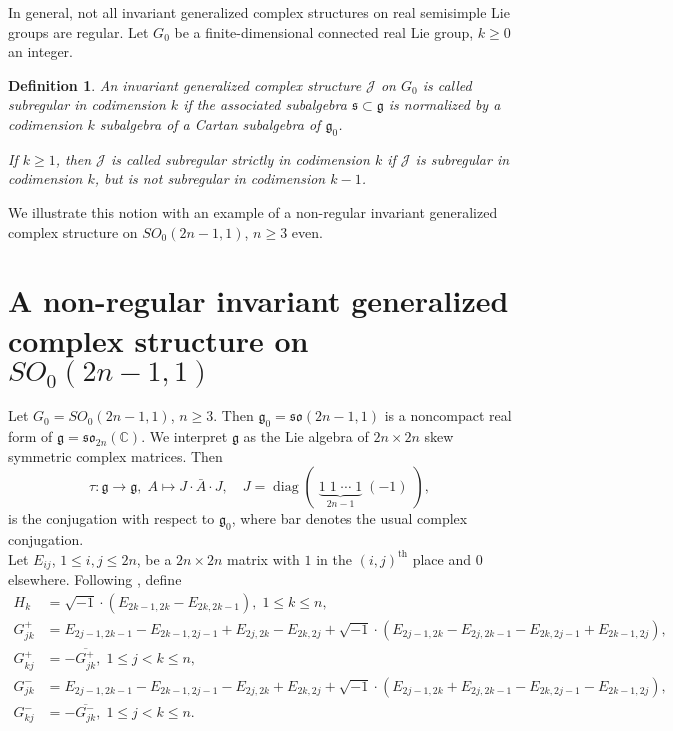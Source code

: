 \documentclass[10pt]{article}
\newtheorem{definition}[theorem]{Definition}
\begin{document}
In general, not all invariant generalized complex structures on real semisimple Lie groups are regular. Let $G_0$ be a finite-dimensional connected real Lie group, $k\geq 0$ an integer.

\begin{definition}
An invariant generalized complex structure $\mathcal J$ on $G_0$ is called \textit{subregular} \textit{in codimension $k$} if the associated subalgebra $\mathfrak{s}\subset \mathfrak{g}$ is normalized by a codimension $k$ subalgebra of a Cartan subalgebra of $\mathfrak{g}_0$.

If $k\geq 1$, then $\mathcal J$ is called \textit{subregular} \textit{strictly} \textit{in codimension $k$} if $\mathcal J$ is subregular in codimension $k$, but is not subregular in codimension $k-1$.
\end{definition}

We illustrate this notion with an example of a non-regular invariant generalized complex structure on $SO_0(2n-1,1)$, $n\geq 3$ even. 

\section{A non-regular invariant generalized complex structure on $SO_0(2n-1,1)$}

Let $G_0=SO_0(2n-1,1)$, $n\geq 3$. Then ${\mathfrak{g}_0}=\mathfrak{so}(2n-1,1)$ is a noncompact real form of $\mathfrak{g}=\mathfrak{so}_{2n}(\mathbb C)$. We interpret $\mathfrak{g}$ as the Lie algebra of $2n \times 2n$ skew symmetric complex matrices. Then 
$$
\tau \colon \mathfrak{g} \to \mathfrak{g}, \; A\mapsto J\cdot \bar{A}\cdot J,\quad J=\operatorname{diag}(\; \underbrace{1 \; 1 \; \cdots \; 1}_{2n-1} \; (-1)\; ),
$$
is the conjugation with respect to $\mathfrak{g}_0$, where bar denotes the usual complex conjugation.\\

Let $E_{ij}$, $1\leq i,j \leq 2n$, be a $2n\times 2n$ matrix with $1$ in the $(i,j)^{\text{th}}$ place and $0$ elsewhere. Following \cite{Helgason}, define
\begin{align*}
H_k & =\sqrt{-1}\cdot \left( E_{2k-1,2k} - E_{2k,2k-1} \right),\; 1\leq k\leq n,\\
G_{jk}^{+} & =E_{2j-1,2k-1} - E_{2k-1,2j-1}+E_{2j,2k} - E_{2k,2j}+\sqrt{-1}\cdot \left( E_{2j-1,2k} - E_{2j,2k-1}-E_{2k,2j-1} + E_{2k-1,2j} \right),\\
G_{kj}^{+} & =-\overline{G_{jk}^{+}},\; 1\leq j<k\leq n,\\
G_{jk}^{-} & =E_{2j-1,2k-1} - E_{2k-1,2j-1}-E_{2j,2k} + E_{2k,2j}+\sqrt{-1}\cdot \left( E_{2j-1,2k} + E_{2j,2k-1}-E_{2k,2j-1} - E_{2k-1,2j} \right),\\
G_{kj}^{-} & =-\overline{G_{jk}^{-}},\; 1\leq j<k\leq n.
\end{align*}
\end{document}
